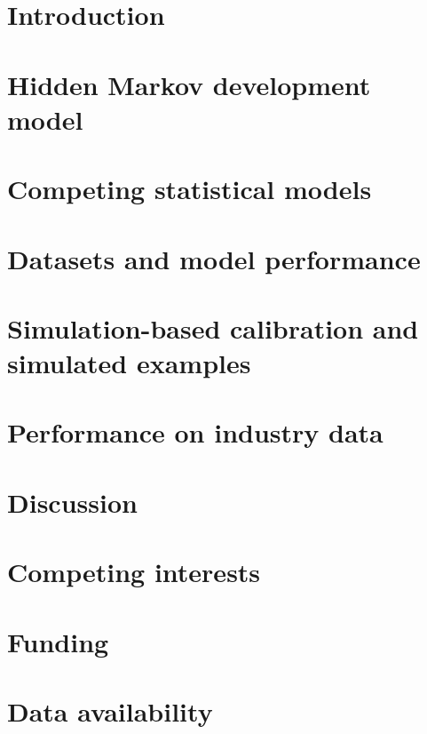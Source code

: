 \documentclass[12pt]{article}
\author[]{}
\begin{document}
\maketitle
\linenumbers


\section{Introduction}
\label{sec:introduction}


\section{Hidden Markov development model}


\section{Competing statistical models}


\section{Datasets and model performance}


\section{Simulation-based calibration and simulated examples}


\section{Performance on industry data}
\label{sec:results}


\section{Discussion}
\label{sec:discussion}


\section{Competing interests}
\label{sec:interests}


\section{Funding}


\section{Data availability}




\end{document}
